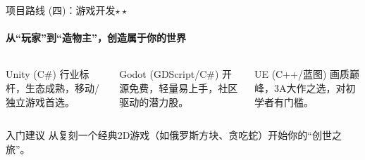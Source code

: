 \documentclass{beamer}
\begin{document}
\begin{frame}{项目路线 (四)：游戏开发$\star \star$}
    \framesubtitle{从“玩家”到“造物主”，创造属于你的世界}
    
    \begin{columns}[T]
        \begin{column}{0.33\textwidth}
            \centering
            \huge Unity
            \small (C\#)
            \vfill
            行业标杆，生态成熟，移动/独立游戏首选。
        \end{column}
        \begin{column}{0.33\textwidth}
            \centering
            \huge Godot
            \small (GDScript/C\#)
            \vfill
            开源免费，轻量易上手，社区驱动的潜力股。
        \end{column}
        \begin{column}{0.33\textwidth}
            \centering
            \huge UE
            \small (C++/蓝图)
            \vfill
            画质巅峰，3A大作之选，对初学者有门槛。
        \end{column}
    \end{columns}

    \vfill
    \begin{alertblock}{入门建议}
        从复刻一个经典2D游戏（如俄罗斯方块、贪吃蛇）开始你的“创世之旅”。
    \end{alertblock}
\end{frame}
\end{document}
